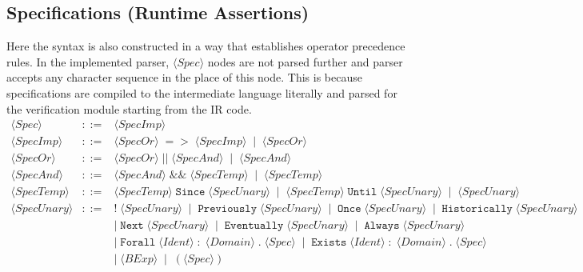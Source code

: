 \documentclass{article}
\begin{document}
\subsection{Specifications (Runtime Assertions)}
Here the syntax is also constructed in a way that establishes operator precedence rules. In the implemented parser, $\langle \mathit{Spec} \rangle$ nodes are not parsed further and parser accepts any character sequence in the place of this node. This is because specifications are compiled to the intermediate language literally and parsed for the verification module starting from the IR code.\footnotemark
\[
\begin{array}{rcl}
\langle \mathit{Spec} \rangle
&::=&
\langle \mathit{SpecImp} \rangle \\[4pt]

\langle \mathit{SpecImp} \rangle
&::=&
\langle \mathit{SpecOr} \rangle\;\mathtt{=>}\;\langle \mathit{SpecImp} \rangle
\;\mid\;
\langle \mathit{SpecOr} \rangle \\[4pt]

\langle \mathit{SpecOr} \rangle
&::=&
\langle \mathit{SpecOr} \rangle\;\mathtt{||}\;\langle \mathit{SpecAnd} \rangle
\;\mid\;
\langle \mathit{SpecAnd} \rangle \\[4pt]

\langle \mathit{SpecAnd} \rangle
&::=&
\langle \mathit{SpecAnd} \rangle\;\mathtt{\&\&}\;\langle \mathit{SpecTemp} \rangle
\;\mid\;
\langle \mathit{SpecTemp} \rangle \\[4pt]

\langle \mathit{SpecTemp} \rangle
&::=&
\langle \mathit{SpecTemp} \rangle\;\mathtt{Since}\;\langle \mathit{SpecUnary} \rangle
\;\mid\;
\langle \mathit{SpecTemp} \rangle\;\mathtt{Until}\;\langle \mathit{SpecUnary} \rangle
\;\mid\;
\langle \mathit{SpecUnary} \rangle \\[4pt]

\langle \mathit{SpecUnary} \rangle
&::=&
\mathtt{!}\;\langle \mathit{SpecUnary} \rangle
\;\mid\;
\mathtt{Previously}\;\langle \mathit{SpecUnary} \rangle
\;\mid\;
\mathtt{Once}\;\langle \mathit{SpecUnary} \rangle
\;\mid\;
\mathtt{Historically}\;\langle \mathit{SpecUnary} \rangle \\[2pt]
&&
\mid\;
\mathtt{Next}\;\langle \mathit{SpecUnary} \rangle
\;\mid\;
\mathtt{Eventually}\;\langle \mathit{SpecUnary} \rangle
\;\mid\;
\mathtt{Always}\;\langle \mathit{SpecUnary} \rangle \\[2pt]
&&
\mid\;
\mathtt{Forall}\;\langle \mathit{Ident} \rangle\; \mathtt{:}\; \langle \mathit{Domain} \rangle\;\texttt{.}\;\langle \mathit{Spec} \rangle
\;\mid\;
\mathtt{Exists}\;\langle \mathit{Ident} \rangle\; \mathtt{:}\; \langle \mathit{Domain} \rangle\;\texttt{.}\;\langle \mathit{Spec} \rangle \\[2pt]
&&
\mid\;
\langle \mathit{BExp} \rangle
\;\mid\;
(\langle \mathit{Spec} \rangle) \\[4pt]


\end{array}\]
\end{document}
